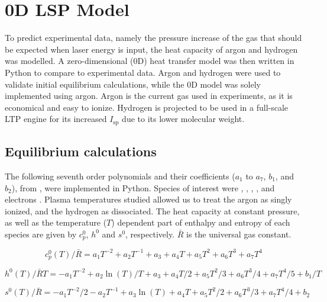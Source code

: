\setcounter{chapter}{3}
\chapter{0D LSP Model} \label{chp:models}

    To predict experimental data, namely the pressure increase of the gas that should be expected when laser energy is input, the heat capacity of argon and hydrogen was modelled. A zero-dimensional (0D) heat transfer model was then written in Python to compare to experimental data. Argon and hydrogen were used to validate initial equilibrium calculations, while the 0D model was solely implemented using argon. Argon is the current gas used in experiments, as it is economical and easy to ionize. Hydrogen is projected to be used in a full-scale LTP engine for its increased $I_\mathrm{sp}$ due to its lower molecular weight.

    \section{Equilibrium calculations} \label{sec:equilibrium calcs}
        
        The following seventh order polynomials and their coefficients ($a_1$ to $a_7$, $b_1$, and $b_2$), from \textcite{mcbrideNASAGlennCoefficients2002}, were implemented in Python. Species of interest were , , , , and electrons . Plasma temperatures studied allowed us to treat the argon as singly ionized, and the hydrogen as dissociated. The heat capacity at constant pressure, as well as the temperature ($T$) dependent part of enthalpy and entropy of each species are given by $c_p^0$, $h^0$ and $s^0$, respectively. $\bar R$ is the universal gas constant.

        \begin{equation}
            c_p^0 (T)/\bar R = a_1 T^{-2} + a_2 T^{-1} + a_3 + a_4   T + a_5 T^2 + a_6 T^3 + a_7 T^4
        \end{equation} 
        
        \begin{equation}
            h^0 (T)/\bar RT = -a_1 T^{-2} + a_2 \ln(T)/T + a_3 + a_4 T / 2 + a_5 {T^2}/3 + a_6 {T^3}/4 + a_7 {T^4}/5 + b_1/T
        \end{equation}
        
        \begin{equation}
            s^0(T)/\bar R = -a_1 T^{-2}/2 - a_2 T^{-1} + a_3\ln(T) + a_4   T + a_5 {T^2}/2 + a_6 T^3/3 + a_7 T^4/4 + b_2
        \end{equation}

